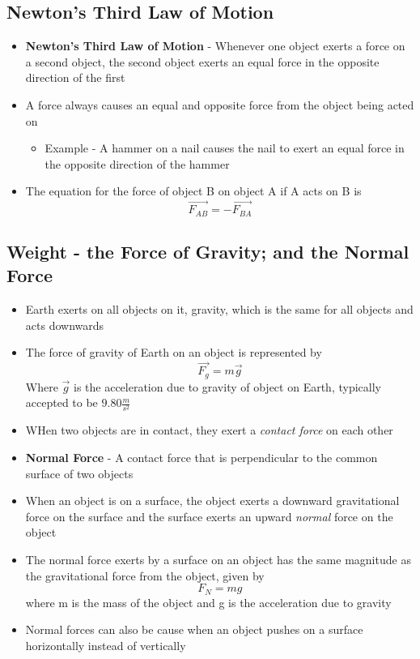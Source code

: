\subsection{Newton's Third Law of Motion}
\begin{itemize}
    \item \textbf{Newton's Third Law of Motion} - Whenever one object exerts a force on a second object, the second object exerts an equal force in the opposite direction of the first
    \item A force always causes an equal and opposite force from the object being acted on
    \begin{itemize}
        \item Example - A hammer on a nail causes the nail to exert an equal force in the opposite direction of the hammer
    \end{itemize}
    \item The equation for the force of object B on object A if A acts on B is \[\vec{F_{AB}}=-\vec{F_{BA}}\]
\end{itemize}

\subsection{Weight - the Force of Gravity; and the Normal Force}
\begin{itemize}
    \item Earth exerts on all objects on it, gravity, which is the same for all objects and acts downwards
    \item The force of gravity of Earth on an object is represented by
    \[\vec{F_{g}}=m\vec{g}\] Where $\vec{g}$ is the acceleration due to gravity of object on Earth, typically accepted to be $9.80\frac{m}{s^2}$
    \item WHen two objects are in contact, they exert a \emph{contact force} on each other
    \item \textbf{Normal Force} - A contact force that is perpendicular to the common surface of two objects
    \item When an object is on a surface, the object exerts a downward gravitational force on the surface and the surface exerts an upward \emph{normal} force on the object
    \item The normal force exerts by a surface on an object has the same magnitude as the gravitational force from the object, given by \[F_N=mg\] where m is the mass of the object and g is the acceleration due to gravity
    \item Normal forces can also be cause when an object pushes on a surface horizontally instead of vertically
\end{itemize}

